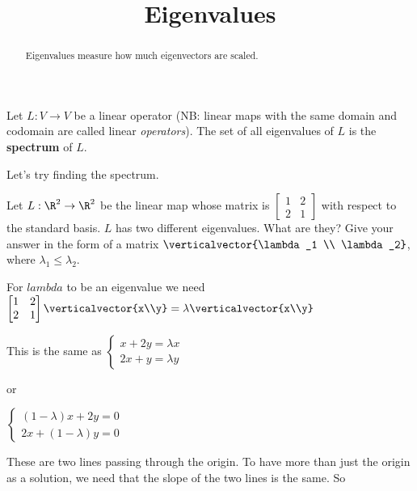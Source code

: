 \documentclass{ximera}
\title{Eigenvalues}
\begin{document}
\begin{abstract}
  Eigenvalues measure how much eigenvectors are scaled.
\end{abstract}\maketitle

\begin{definition}
  Let $L : V \to V$ be a linear operator (NB: linear maps with the
  same domain and codomain are called linear \textit{operators}).  The
  set of all eigenvalues of $L$ is the \textbf{spectrum} of $L$.
\end{definition}

Let's try finding the spectrum.

\begin{question}
  Let $L :\R^2 \to \R^2$ be the linear map whose matrix is
  \(\begin{bmatrix} 1 & 2 \\2& 1\end{bmatrix}\) with respect to the
  standard basis.  $L$ has two different eigenvalues.  What are they?
  Give your answer in the form of a matrix $\verticalvector{\lambda_1 \\
    \lambda_2}$, where $\lambda_1 \leq \lambda_2$.
	
  \begin{solution}
    \begin{hint}
      For $lambda$ to be an eigenvalue we need
      \(\begin{bmatrix} 1 & 2 \\2& 1\end{bmatrix} \verticalvector{x\\y} = \lambda \verticalvector{x\\y}\)
    \end{hint}
    \begin{hint}
      This is the same as \(\begin{cases}
        x+2y = \lambda x \\
        2x+y =\lambda y
      \end{cases}\)
      
      or
      
      \(\begin{cases}
        (1-\lambda)x+2y = 0 \\
        2x+(1-\lambda)y =0
      \end{cases}\)
      
    \end{hint}
    \begin{hint}
      These are two lines passing through the origin.  To have more than just the origin as a solution, we need that the slope of the two lines is the same.  So
      

\end{hint}
\end{solution}
\end{question}
\end{document}

